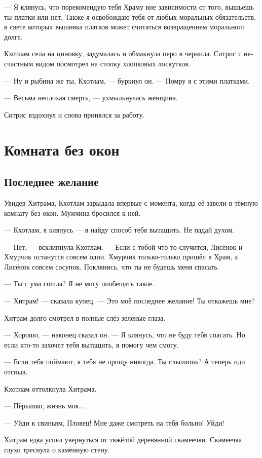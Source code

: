 \documentclass[a4paper,12pt,fleqn]{book}\usepackage{cooltooltips}\usepackage{polyglossia}\setdefaultlanguage[babelshorthands=true]{russian}\setotherlanguage{english}\defaultfontfeatures{Ligatures=TeX,Mapping=tex-text} \usepackage{xcolor}\definecolor{lightgray}{HTML}{bbbbbb}\color{lightgray}\newcommand{\ml}[3]{\textenglish{\textcolor{black}{#3}} }
\begin{document}
--- Я клянусь, что порекомендую тебя Храму вне зависимости от того, вышьешь ты платки или нет.
Также я освобождаю тебя от любых моральных обязательств, в свете которых вышивка платков может считаться возвращением морального долга.

Кхотлам села на циновку, задумалась и обмакнула перо в чернила.
Ситрис с несчастным видом посмотрел на стопку хлопковых лоскутков.

--- Ну и рыбина же ты, Кхотлам, --- буркнул он.
--- Помру я с этими платками.

--- Весьма неплохая смерть, --- ухмыльнулась женщина.

Ситрис вздохнул и снова принялся за работу.

\chapter{Комната без окон}

\section{Последнее желание}

Увидев Хитрама, Кхотлам зарыдала впервые с момента, когда её завели в тёмную комнату без окон.
Мужчина бросился к ней.

--- Кхотлам, я клянусь --- я найду способ тебя вытащить.
Не падай духом.

--- Нет, --- всхлипнула Кхотлам.
--- Если с тобой что-то случится, Лисёнок и Хмурчик останутся совсем одни.
Хмурчик только-только пришёл в Храм, а Лисёнок совсем сосунок.
Поклянись, что ты не будешь меня спасать.

--- Ты с ума сошла?
Я не могу пообещать такое.

--- Хитрам! --- сказала купец.
--- Это моё последнее желание!
Ты откажешь мне?

Хитрам долго смотрел в полные слёз зелёные глаза.

--- Хорошо, --- наконец сказал он.
--- Я клянусь, что не буду тебя спасать.
Но если кто-то захочет тебя вытащить, я помогу чем смогу.

--- Если тебя поймают, я тебя не прощу никогда.
Ты слышишь?
А теперь иди отсюда.

Кхотлам оттолкнула Хитрама.

--- Пёрышко, жизнь моя...

--- Уйди к свиньям, Пловец!
Мне даже смотреть на тебя больно!
Уйди!

Хитрам едва успел увернуться от тяжёлой деревянной скамеечки.
Скамеечка глухо треснула о каменную стену.
\end{document}
